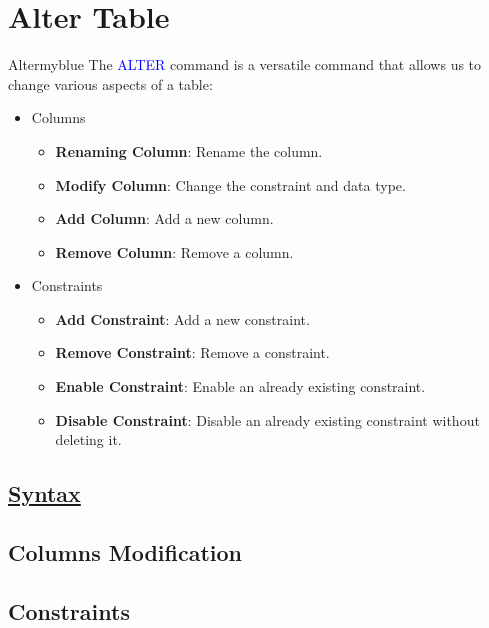 \vspace{0.35cm}
\section{Alter Table}
\begin{prettyBox}{Alter}{myblue}
    The \textcolor{blue}{ALTER} command is a versatile command that allows us to change various aspects of a table:
\begin{itemize}
    \item Columns
        \begin{itemize}
            \item \textbf{Renaming Column}: Rename the column.
            \item \textbf{Modify Column}: Change the constraint and data type.
            \item \textbf{Add Column}: Add a new column.
            \item \textbf{Remove Column}: Remove a column.
        \end{itemize}
    \item Constraints
        \begin{itemize}
            \item \textbf{Add Constraint}: Add a new constraint. 
            \item \textbf{Remove Constraint}: Remove a constraint.
            \item \textbf{Enable Constraint}: Enable an already existing constraint.
            \item \textbf{Disable Constraint}: Disable an already existing constraint without deleting it.
        \end{itemize}
\end{itemize}
\end{prettyBox}

\vspace{0.15cm}
\subsection*{\underline{Syntax}}

\subsection*{Columns Modification}



\subsection*{Constraints}

